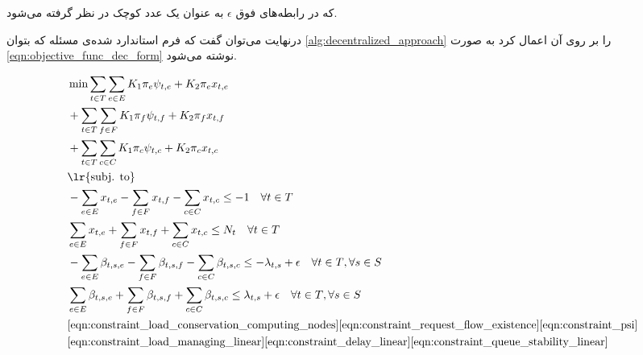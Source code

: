 	که در رابطه‌های فوق $\epsilon$ به عنوان یک عدد کوچک در نظر گرفته می‌شود. 

	درنهایت می‌توان گفت که فرم استاندارد شده‌ی مسئله که بتوان \cref{alg:decentralized_approach} را بر روی آن اعمال کرد به صورت \cref{eqn:objective_func_dec_form} نوشته می‌شود. 
	
	\begin{align}\label{eqn:objective_func_dec_form}
		&\min \sum_{t \in T}\sum_{e \in E} K_1\pi_e\psi_{t,e}+K_2\pi_ex_{t,e} \notag \\
		&+\sum_{t \in T}\sum_{f \in F} 	K_1\pi_f\psi_{t,f}+K_2\pi_fx_{t,f}\notag \\
		&+\sum_{t \in T}\sum_{c \in C} K_1\pi_c\psi_{t,c}+K_2\pi_cx_{t,c}  \notag \\
		&\text{\lr{subj. to}} \notag \\
		&-\sum_{e \in E}x_{t,e} - \sum_{f \in F}x_{t,f} - \sum_{c \in C}x_{t,c} \le -1 \quad \forall{t \in T} \notag \\
		&\sum_{e \in E}x_{t,e} + \sum_{f \in F}x_{t,f} + \sum_{c \in C}x_{t,c} \le N_t \quad \forall{t \in T} \notag \\
		&-\sum_{e \in E} \beta_{t,s,e} - \sum_{f \in F} \beta_{t,s,f}
		-\sum_{c \in C}\beta_{t,s,c} \le -\lambda_{t,s}+\epsilon \quad \forall{t \in T}, \forall{s \in S} \notag \\ 
		&\sum_{e \in E} \beta_{t,s,e} + \sum_{f \in F} \beta_{t,s,f}
		+\sum_{c \in C}\beta_{t,s,c} \le \lambda_{t,s}+\epsilon \quad \forall{t \in T}, \forall{s \in S} \notag \\		
		&\cref{eqn:constraint_load_conservation_computing_nodes}
		\cref{eqn:constraint_request_flow_existence}				
		\cref{eqn:constraint_psi} \notag \\
		&\cref{eqn:constraint_load_managing_linear} 
		\cref{eqn:constraint_delay_linear}
		\cref{eqn:constraint_queue_stability_linear}
	\end{align}
	
